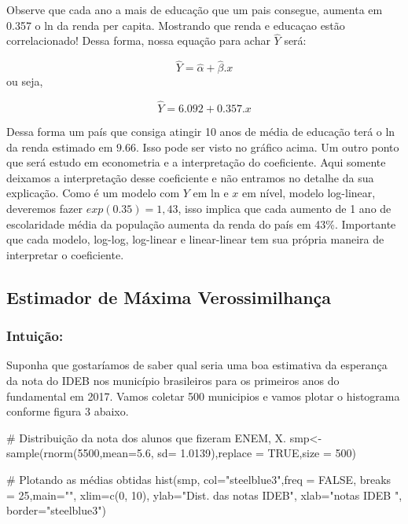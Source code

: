\documentclass[
  letterpaper,
  DIV=11,
  numbers=noendperiod]{scrartcl}
\newenvironment{Shaded}{\begin{snugshade}}{\end{snugshade}}
\newcommand{\AttributeTok}[1]{\textcolor[rgb]{0.40,0.45,0.13}{#1}}
\newcommand{\CommentTok}[1]{\textcolor[rgb]{0.37,0.37,0.37}{#1}}
\newcommand{\ConstantTok}[1]{\textcolor[rgb]{0.56,0.35,0.01}{#1}}
\newcommand{\DecValTok}[1]{\textcolor[rgb]{0.68,0.00,0.00}{#1}}
\newcommand{\FloatTok}[1]{\textcolor[rgb]{0.68,0.00,0.00}{#1}}
\newcommand{\FunctionTok}[1]{\textcolor[rgb]{0.28,0.35,0.67}{#1}}
\newcommand{\NormalTok}[1]{\textcolor[rgb]{0.00,0.23,0.31}{#1}}
\newcommand{\OtherTok}[1]{\textcolor[rgb]{0.00,0.23,0.31}{#1}}
\newcommand{\StringTok}[1]{\textcolor[rgb]{0.13,0.47,0.30}{#1}}
\begin{document}
Observe que cada ano a mais de educação que um pais consegue, aumenta em
0.357 o ln da renda per capita. Mostrando que renda e educaçao estão
correlacionado! Dessa forma, nossa equação para achar \(\hat{Y}\) será:

\[\hat{Y}=\hat{\alpha}+\hat{\beta}.x\] ou seja,

\[\hat{Y}=6.092+0.357.x\]

Dessa forma um país que consiga atingir 10 anos de média de educação
terá o ln da renda estimado em \(9.66\). Isso pode ser visto no gráfico
acima. Um outro ponto que será estudo em econometria e a interpretação
do coeficiente. Aqui somente deixamos a interpretação desse coeficiente
e não entramos no detalhe da sua explicação. Como é um modelo com \(Y\)
em ln e \(x\) em nível, modelo log-linear, deveremos fazer
\(exp(0.35)=1,43\), isso implica que cada aumento de 1 ano de
escolaridade média da população aumenta da renda do país em 43\%.
Importante que cada modelo, log-log, log-linear e linear-linear tem sua
própria maneira de interpretar o coeficiente.

\subsection{Estimador de Máxima
Verossimilhança}\label{estimador-de-muxe1xima-verossimilhanuxe7a}

\subsubsection{Intuição:}\label{intuiuxe7uxe3o}

Suponha que gostaríamos de saber qual seria uma boa estimativa da
esperança da nota do IDEB nos município brasileiros para os primeiros
anos do fundamental em 2017. Vamos coletar 500 municipios e vamos plotar
o histograma conforme figura 3 abaixo.

\begin{Shaded}
\begin{Highlighting}[]
\CommentTok{\# Distribuição da nota dos alunos que fizeram ENEM, X. }
\NormalTok{smp}\OtherTok{\textless{}{-}}\FunctionTok{sample}\NormalTok{(}\FunctionTok{rnorm}\NormalTok{(}\DecValTok{5500}\NormalTok{,}\AttributeTok{mean=}\FloatTok{5.6}\NormalTok{, }\AttributeTok{sd=} \FloatTok{1.0139}\NormalTok{),}\AttributeTok{replace =} \ConstantTok{TRUE}\NormalTok{,}\AttributeTok{size =} \DecValTok{500}\NormalTok{)}

\CommentTok{\# Plotando as médias obtidas}
\FunctionTok{hist}\NormalTok{(smp, }\AttributeTok{col=}\StringTok{"steelblue3"}\NormalTok{,}\AttributeTok{freq =} \ConstantTok{FALSE}\NormalTok{, }\AttributeTok{breaks =} \DecValTok{25}\NormalTok{,}\AttributeTok{main=}\StringTok{""}\NormalTok{,}
     \AttributeTok{xlim=}\FunctionTok{c}\NormalTok{(}\DecValTok{0}\NormalTok{, }\DecValTok{10}\NormalTok{), }\AttributeTok{ylab=}\StringTok{"Dist. das notas IDEB"}\NormalTok{, }\AttributeTok{xlab=}\StringTok{"notas IDEB "}\NormalTok{,}
     \AttributeTok{border=}\StringTok{"steelblue3"}\NormalTok{)}
\end{Highlighting}
\end{Shaded}
\end{document}
